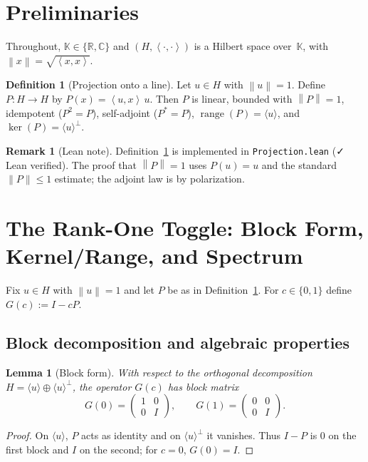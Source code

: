\documentclass[11pt]{article}
\newtheorem{lemma}[theorem]{Lemma}
\theoremstyle{definition}
\newtheorem{definition}[theorem]{Definition}
\newtheorem{remark}[theorem]{Remark}
\newcommand{\K}{\mathbb{K}}
\newcommand{\R}{\mathbb{R}}
\newcommand{\C}{\mathbb{C}}
\newcommand{\ip}[2]{\left\langle #1,#2\right\rangle}
\newcommand{\norm}[1]{\left\lVert #1\right\rVert}
\DeclareMathOperator{\range}{range}
\DeclareMathOperator{\kerop}{ker}
\newcommand{\leanok}{\textsf{\small \textcolor{green!60!black}{✓ Lean verified}}}
\begin{document}
\section{Preliminaries}

Throughout, $\K\in\{\R,\C\}$ and $(H,\ip{\cdot}{\cdot})$ is a Hilbert space over~$\K$, with $\norm{x}=\sqrt{\ip{x}{x}}$.

\begin{definition}[Projection onto a line]\label{def:proj}
Let $u\in H$ with $\norm{u}=1$. Define $P:H\to H$ by $P(x)=\ip{u}{x}\,u$. Then $P$ is linear, bounded with $\norm{P}=1$, idempotent ($P^2=P$), self-adjoint ($P^\ast=P$), $\range(P)=\langle u\rangle$, and $\kerop(P)=\langle u\rangle^\perp$.
\end{definition}

\begin{remark}[Lean note]
Definition~\ref{def:proj} is implemented in \texttt{Projection.lean} (\leanok). The proof that $\norm{P}=1$ uses $P(u)=u$ and the standard $\lVert P\rVert\le 1$ estimate; the adjoint law is by polarization.
\end{remark}

\section{The Rank-One Toggle: Block Form, Kernel/Range, and Spectrum}\label{sec:toggle}

Fix $u\in H$ with $\norm{u}=1$ and let $P$ be as in Definition~\ref{def:proj}. For $c\in\{0,1\}$ define $G(c):=I-cP$.

\subsection{Block decomposition and algebraic properties}

\begin{lemma}[Block form]\label{lem:block}
With respect to the orthogonal decomposition $H=\langle u\rangle\oplus \langle u\rangle^\perp$, the operator $G(c)$ has block matrix
\[
G(0)=\begin{pmatrix}1&0\\[2pt]0&I\end{pmatrix},\qquad
G(1)=\begin{pmatrix}0&0\\[2pt]0&I\end{pmatrix}.
\]
\end{lemma}

\begin{proof}
On $\langle u\rangle$, $P$ acts as identity and on $\langle u\rangle^\perp$ it vanishes. Thus $I-P$ is $0$ on the first block and $I$ on the second; for $c=0$, $G(0)=I$.
\end{proof}
\end{document}
